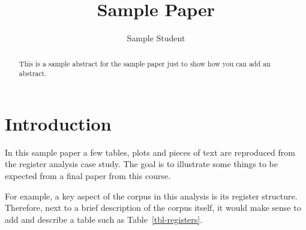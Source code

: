 \documentclass[
  letterpaper,
  DIV=11,
  numbers=noendperiod]{scrartcl}
\title{Sample Paper}
\author{Sample Student}
\date{}
\renewcommand*\contentsname{Table of contents}
\newcommand\contentsname{Table of contents}
\begin{document}
\maketitle
\begin{abstract}
This is a sample abstract for the sample paper just to show how you can
add an abstract.
\end{abstract}
\ifdefined\Shaded\renewenvironment{Shaded}{\begin{tcolorbox}[interior hidden, borderline west={3pt}{0pt}{shadecolor}, frame hidden, boxrule=0pt, sharp corners, enhanced, breakable]}{\end{tcolorbox}}\fi

\renewcommand*\contentsname{Table of contents}
{
\hypersetup{linkcolor=}
\setcounter{tocdepth}{3}
\tableofcontents
}
\listoffigures
\listoftables
\hypertarget{introduction}{%
\section{Introduction}\label{introduction}}

In this sample paper a few tables, plots and pieces of text are
reproduced from the register analysis case study. The goal is to
illustrate some things to be expected from a final paper from this
course.

For example, a key aspect of the corpus in this analysis is its register
structure. Therefore, next to a brief description of the corpus itself,
it would make sense to add and describe a table such as
Table~\ref{tbl-registers}.
\end{document}
